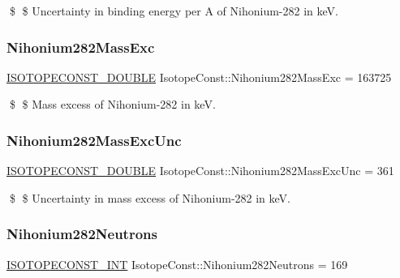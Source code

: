 \$ \$ Uncertainty in binding energy per A of Nihonium-\/282 in keV. \mbox{\label{group___isotope_const-_nihonium-_nh282_ga1e329741aa033ad7d05f520b7c7c1b29}} 
\subsubsection{\texorpdfstring{Nihonium282\+Mass\+Exc}{Nihonium282MassExc}}
{\footnotesize\ttfamily \mbox{\hyperlink{group___isotope_const-_macros_ga8f45a7272ce02c0b4c65c44636ed719a}{I\+S\+O\+T\+O\+P\+E\+C\+O\+N\+S\+T\+\_\+\+D\+O\+U\+B\+LE}} Isotope\+Const\+::\+Nihonium282\+Mass\+Exc = 163725}

\$ \$ Mass excess of Nihonium-\/282 in keV. \mbox{\label{group___isotope_const-_nihonium-_nh282_gaf30ca19c6784c9afaf812bd746b2ee7b}} 
\subsubsection{\texorpdfstring{Nihonium282\+Mass\+Exc\+Unc}{Nihonium282MassExcUnc}}
{\footnotesize\ttfamily \mbox{\hyperlink{group___isotope_const-_macros_ga8f45a7272ce02c0b4c65c44636ed719a}{I\+S\+O\+T\+O\+P\+E\+C\+O\+N\+S\+T\+\_\+\+D\+O\+U\+B\+LE}} Isotope\+Const\+::\+Nihonium282\+Mass\+Exc\+Unc = 361}

\$ \$ Uncertainty in mass excess of Nihonium-\/282 in keV. \mbox{\label{group___isotope_const-_nihonium-_nh282_ga86283920e4033f0f68de992a5e7068fd}} 
\subsubsection{\texorpdfstring{Nihonium282\+Neutrons}{Nihonium282Neutrons}}
{\footnotesize\ttfamily \mbox{\hyperlink{group___isotope_const-_macros_ga5f18360b3e99483a35c32d789e62621c}{I\+S\+O\+T\+O\+P\+E\+C\+O\+N\+S\+T\+\_\+\+I\+NT}} Isotope\+Const\+::\+Nihonium282\+Neutrons = 169}

